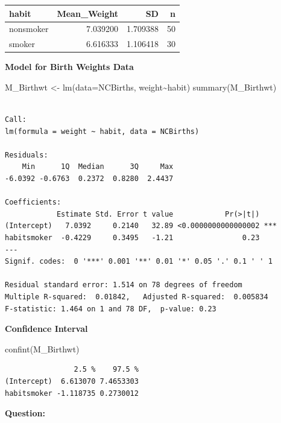 \documentclass[
  letterpaper,
  DIV=11,
  numbers=noendperiod]{scrreprt}
\newenvironment{Shaded}{\begin{snugshade}}{\end{snugshade}}
\newcommand{\AttributeTok}[1]{\textcolor[rgb]{0.40,0.45,0.13}{#1}}
\newcommand{\FunctionTok}[1]{\textcolor[rgb]{0.28,0.35,0.67}{#1}}
\newcommand{\NormalTok}[1]{\textcolor[rgb]{0.00,0.23,0.31}{#1}}
\newcommand{\OtherTok}[1]{\textcolor[rgb]{0.00,0.23,0.31}{#1}}
\newcommand{\SpecialCharTok}[1]{\textcolor[rgb]{0.37,0.37,0.37}{#1}}
\begin{document}
\begin{longtable}[]{@{}lrrr@{}}
\toprule\noalign{}
habit & Mean\_Weight & SD & n \\
\midrule\noalign{}
\endhead
\bottomrule\noalign{}
\endlastfoot
nonsmoker & 7.039200 & 1.709388 & 50 \\
smoker & 6.616333 & 1.106418 & 30 \\
\end{longtable}

\textbf{Model for Birth Weights Data}

\begin{Shaded}
\begin{Highlighting}[]
\NormalTok{M\_Birthwt }\OtherTok{\textless{}{-}} \FunctionTok{lm}\NormalTok{(}\AttributeTok{data=}\NormalTok{NCBirths, weight}\SpecialCharTok{\textasciitilde{}}\NormalTok{habit)}
\FunctionTok{summary}\NormalTok{(M\_Birthwt)}
\end{Highlighting}
\end{Shaded}

\begin{verbatim}

Call:
lm(formula = weight ~ habit, data = NCBirths)

Residuals:
    Min      1Q  Median      3Q     Max 
-6.0392 -0.6763  0.2372  0.8280  2.4437 

Coefficients:
            Estimate Std. Error t value            Pr(>|t|)    
(Intercept)   7.0392     0.2140   32.89 <0.0000000000000002 ***
habitsmoker  -0.4229     0.3495   -1.21                0.23    
---
Signif. codes:  0 '***' 0.001 '**' 0.01 '*' 0.05 '.' 0.1 ' ' 1

Residual standard error: 1.514 on 78 degrees of freedom
Multiple R-squared:  0.01842,   Adjusted R-squared:  0.005834 
F-statistic: 1.464 on 1 and 78 DF,  p-value: 0.23
\end{verbatim}

\textbf{Confidence Interval}

\begin{Shaded}
\begin{Highlighting}[]
\FunctionTok{confint}\NormalTok{(M\_Birthwt)}
\end{Highlighting}
\end{Shaded}

\begin{verbatim}
                2.5 %    97.5 %
(Intercept)  6.613070 7.4653303
habitsmoker -1.118735 0.2730012
\end{verbatim}

\textbf{Question:}
\end{document}
